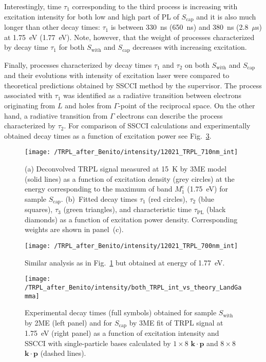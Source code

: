 
Interestingly, time $\tau_1$ corresponding to the third process is increasing with excitation intensity for both low and high part of PL of $S_\mathrm{cap}$ and it is also much longer than other decay times: $\tau_1$ is between 330~ns (650~ns) and 380~ns (2.8~$\mu$s) at 1.75~eV (1.77~eV). Note, however, that the weight of processes characterized by decay time $\tau_1$ for both $S_\mathrm{with}$ and $S_\mathrm{cap}$ decreases with increasing excitation.


Finally, processes characterized by decay times $\tau_1$ and $\tau_2$ on both $S_\mathrm{with}$ and $S_\mathrm{cap}$ and their evolutions with intensity of excitation laser were compared to theoretical predictions obtained by SSCCI method by the supervisor. The process associated with $\tau_1$ was identified as a radiative transition between electrons originating from $L$ and holes from $\Gamma$-point of the reciprocal space. On the other hand, a radiative transition from $\Gamma$ electrons can describe the process characterized by $\tau_2$. For comparison of SSCCI calculations and experimentally obtained decay times as a function of excitation power see Fig.~\ref{fig:TRPL_int_c_theory}.


\begin{figure}
	\centering
	\texttt{[image: /TRPL\_after\_Benito/intensity/12021\_TRPL\_710nm\_int]}
	\caption{(a) Deconvolved TRPL signal measured at 15~K by 3ME model (solid lines) as a function of excitation density (grey circles) at the energy corresponding to the maximum of band $M_1^\mathrm{c}$ (1.75~eV) for sample $S_\mathrm{cap}$. (b)~Fitted decay times $\tau_1$ (red circles), $\tau_2$ (blue squares), $\tau_3$ (green triangles), and characteristic time $\tau_\mathrm{PL}$ (black diamonds) as a function of excitation power density. Corresponding weights are shown in panel~(c).}
	\label{fig:TRPL_int_c}
\end{figure}

\begin{figure}
	\centering
	\texttt{[image: /TRPL\_after\_Benito/intensity/12021\_TRPL\_700nm\_int]}
	\caption{Similar analysis as in Fig.~\ref{fig:TRPL_int_c} but obtained at energy of 1.77~eV.}
	\label{fig:TRPL_int_c_L}
\end{figure}

\begin{figure}
	\centering
	\texttt{[image: /TRPL\_after\_Benito/intensity/both\_TRPL\_int\_vs\_theory\_LandGamma]}
	\caption{Experimental decay times (full symbols) obtained for sample $S_\mathrm{with}$ by 2ME (left panel) and for $S_\mathrm{cap}$ by 3ME fit of TRPL signal at 1.75~eV (right panel) as a function of excitation intensity and SSCCI with single-particle bases calculated by $1\times8$ $\mathbf{k\cdot p}$ and $8\times8$ $\mathbf{k\cdot p}$ (dashed lines).}
	\label{fig:TRPL_int_c_theory}
\end{figure}

